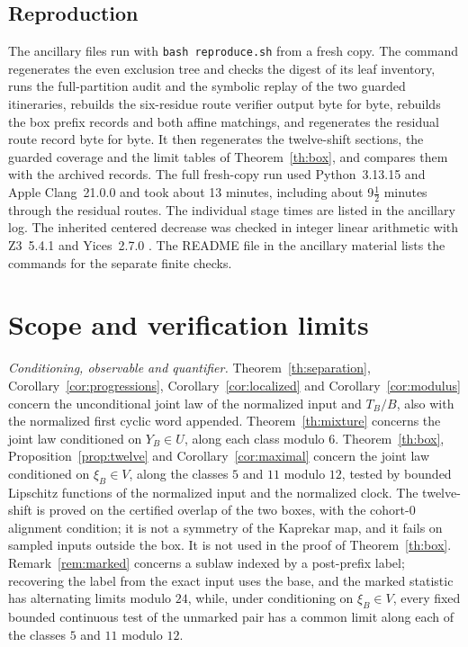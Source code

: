 \documentclass[11pt,reqno]{amsart}
\theoremstyle{remark}
\begin{document}
\subsection*{Reproduction}
The ancillary files run with \texttt{bash reproduce.sh} from a fresh copy. The command regenerates the even exclusion tree and checks the digest of its leaf inventory, runs the full-partition audit and the symbolic replay of the two guarded itineraries, rebuilds the six-residue route verifier output byte for byte, rebuilds the box prefix records and both affine matchings, and regenerates the residual route record byte for byte. It then regenerates the twelve-shift sections, the guarded coverage and the limit tables of Theorem~\ref{th:box}, and compares them with the archived records. The full fresh-copy run used Python~3.13.15 and Apple Clang~21.0.0 and took about 13 minutes, including about 9\(\tfrac12\) minutes through the residual routes. The individual stage times are listed in the ancillary log. The inherited centered decrease was checked in integer linear arithmetic with Z3~5.4.1 and Yices~2.7.0 \cite[Appendix~E]{G6}. The README file in the ancillary material lists the commands for the separate finite checks.

\section{Scope and verification limits}\label{sec:scope}

\emph{Conditioning, observable and quantifier.} Theorem~\ref{th:separation}, Corollary~\ref{cor:progressions}, Corollary~\ref{cor:localized} and Corollary~\ref{cor:modulus} concern the unconditional joint law of the normalized input and \(T_B/B\), also with the normalized first cyclic word appended. Theorem~\ref{th:mixture} concerns the joint law conditioned on \(Y_B\in U\), along each class modulo \(6\). Theorem~\ref{th:box}, Proposition~\ref{prop:twelve} and Corollary~\ref{cor:maximal} concern the joint law conditioned on \(\xi_B\in V\), along the classes \(5\) and \(11\) modulo \(12\), tested by bounded Lipschitz functions of the normalized input and the normalized clock. The twelve-shift is proved on the certified overlap of the two boxes, with the cohort-\(0\) alignment condition; it is not a symmetry of the Kaprekar map, and it fails on sampled inputs outside the box. It is not used in the proof of Theorem~\ref{th:box}. Remark~\ref{rem:marked} concerns a sublaw indexed by a post-prefix label; recovering the label from the exact input uses the base, and the marked statistic has alternating limits modulo \(24\), while, under conditioning on \(\xi_B\in V\), every fixed bounded continuous test of the unmarked pair has a common limit along each of the classes \(5\) and \(11\) modulo \(12\).
\end{document}
